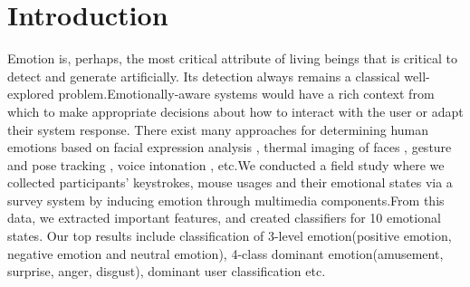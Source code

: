 \chapter{Introduction}
\begin{flushleft}
Emotion is, perhaps, the most critical attribute of living beings that is critical to detect and generate artificially. Its detection always remains a classical well-explored problem.Emotionally-aware systems
would have a rich context from which to make appropriate
decisions about how to interact with the user or adapt their
system response. There exist many approaches for determining human emotions based on facial expression analysis \cite{ioannou}, thermal imaging of faces \cite{kong}, gesture and pose tracking \cite{gunes}, voice intonation \cite{kwon}, etc.We conducted a field study where we collected
participants’ keystrokes, mouse usages and their emotional states via a survey system by inducing emotion through multimedia components.From this data, we extracted important features,
and created classifiers for 10 emotional states. Our top
results include classification of 3-level emotion(positive emotion, negative emotion and neutral emotion), 4-class dominant emotion(amusement, surprise, anger, disgust), dominant user classification etc.
\end{flushleft}













